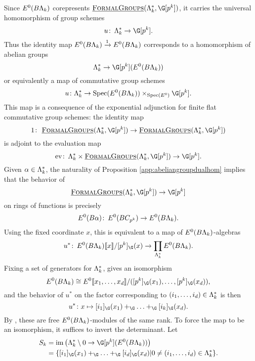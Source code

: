 Since \(E^0(B\Lambda_k)\) corepresents \(\InternalHom{FormalGroups}(\Lk^*,\G[p^k])\), it carries the universal homomorphism of group schemes
\[
u \co \Lk^* \rightarrow \G[p^k].
\]
Thus the identity map \(E^0(B\Lambda_k) \xrightarrow{1} E^0(B\Lambda_k)\) corresponds to a homomorphism of abelian groups
\[
\Lk^* \rightarrow \G[p^k](E^0(B\Lk))
\]
or equivalently a map of commutative group schemes
\[
u \colon \Lk^* \rightarrow \Spec(E^0(B\Lk)) \times_{\Spec(E^0)} \G[p^k].
\]
This map is a consequence of the exponential adjunction for finite flat commutative group schemes: the identity map
\[
1 \co \InternalHom{FormalGroups}(\Lk^*,\G[p^k]) \to \InternalHom{FormalGroups}(\Lk^*,\G[p^k])
\]
is adjoint to the evaluation map
\[
\mathrm{ev} \co \Lk^* \times  \InternalHom{FormalGroups}(\Lk^*,\G[p^k]) \to \G[p^k].
\]
Given \(\alpha \in \Lambda_k^*\), the naturality of Proposition \ref{app:abeliangroupdualhom} implies that the behavior of
\[
\InternalHom{FormalGroups}(\Lk^*,\G[p^k]) \to \G[p^k]
\]
on rings of functions is precisely
\[
E^0(B\alpha) \colon\thinspace E^0(BC_{p^k}) \to E^0(B\Lambda_k).
\]
Using the fixed coordinate \(x\), this is equivalent to a map of \(E^0(B\Lambda_k)\)-algebras
\[
u^* \co E^0(B\Lk)\ps{x}/[p^k]_{\G}(x) \xrightarrow{} \prod_{\Lk^*} E^0(B\Lk).
\]
Fixing a set of generators for \(\Lambda_k^*\), gives an isomorphism
\[
E^0(B\Lk) \cong E^0\ps{x_1, \ldots, x_d}/([p^k]_{\G}(x_1), \ldots, [p^k]_{\G}(x_d)),
\]
and the behavior of \(u^*\) on the factor corresponding to \((i_1, \ldots, i_d) \in \Lambda_k^*\) is then
\[
u^* \colon x \mapsto [i_1]_{\G}(x_1)+_{\G} \ldots +_{\G} [i_k]_{\G}(x_d).
\]
By , these are free \(E^0(B\Lambda_k)\)-modules of the same rank. To force the map to be an isomorphism, it suffices to invert the determinant. Let
\begin{align*}
S_k &= \im \big (\Lk^* \setminus 0 \rightarrow \G[p^k](E^0(B\Lk)) \big ) \\ &= \{ [i_1]_{\G}(x_1)+_{\G} \ldots +_{\G} [i_d]_{\G}(x_d)| 0 \neq (i_1, \ldots, i_d) \in \Lk^* \}.
\end{align*}


